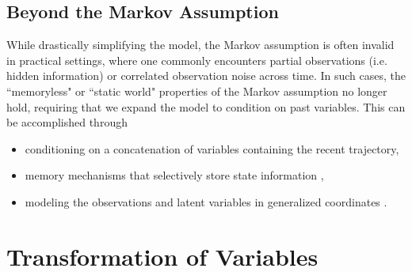 
\subsection{Beyond the Markov Assumption}
While drastically simplifying the model, the Markov assumption is often invalid in practical settings, where one commonly encounters partial observations (i.e. hidden information) or correlated observation noise across time. In such cases, the ``memoryless" or ``static world" properties of the Markov assumption no longer hold, requiring that we expand the model to condition on past variables. This can be accomplished through
\begin{itemize}
	\item conditioning on a concatenation of variables containing the recent trajectory,
	\item memory mechanisms that selectively store state information \cite{chung2015recurrent, fraccaro2016sequential, gemici2017generative},
	\item modeling the observations and latent variables in generalized coordinates \cite{friston2010generalised}.
\end{itemize}

\section{Transformation of Variables}
\label{sec: transformation of variables}

